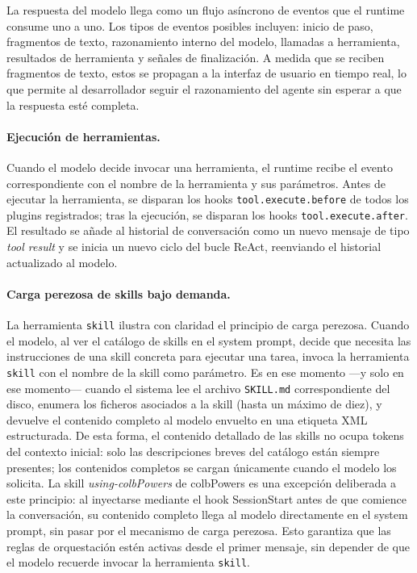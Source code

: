 \documentclass[11pt, letterpaper]{article}
\begin{document}
La respuesta del modelo llega como un flujo asíncrono de eventos que el runtime consume uno a uno. Los tipos de eventos posibles incluyen: inicio de paso, fragmentos de texto, razonamiento interno del modelo, llamadas a herramienta, resultados de herramienta y señales de finalización. A medida que se reciben fragmentos de texto, estos se propagan a la interfaz de usuario en tiempo real, lo que permite al desarrollador seguir el razonamiento del agente sin esperar a que la respuesta esté completa.

\paragraph{Ejecución de herramientas.}
Cuando el modelo decide invocar una herramienta, el runtime recibe el evento correspondiente con el nombre de la herramienta y sus parámetros. Antes de ejecutar la herramienta, se disparan los hooks \texttt{tool.execute.before} de todos los plugins registrados; tras la ejecución, se disparan los hooks \texttt{tool.execute.after}. El resultado se añade al historial de conversación como un nuevo mensaje de tipo \textit{tool result} y se inicia un nuevo ciclo del bucle ReAct, reenviando el historial actualizado al modelo.

\paragraph{Carga perezosa de skills bajo demanda.}
La herramienta \texttt{skill} ilustra con claridad el principio de carga perezosa. Cuando el modelo, al ver el catálogo de skills en el system prompt, decide que necesita las instrucciones de una skill concreta para ejecutar una tarea, invoca la herramienta \texttt{skill} con el nombre de la skill como parámetro. Es en ese momento ---y solo en ese momento--- cuando el sistema lee el archivo \texttt{SKILL.md} correspondiente del disco, enumera los ficheros asociados a la skill (hasta un máximo de diez), y devuelve el contenido completo al modelo envuelto en una etiqueta XML estructurada. De esta forma, el contenido detallado de las skills no ocupa tokens del contexto inicial: solo las descripciones breves del catálogo están siempre presentes; los contenidos completos se cargan únicamente cuando el modelo los solicita. La skill \textit{using-colbPowers} de colbPowers es una excepción deliberada a este principio: al inyectarse mediante el hook SessionStart antes de que comience la conversación, su contenido completo llega al modelo directamente en el system prompt, sin pasar por el mecanismo de carga perezosa. Esto garantiza que las reglas de orquestación estén activas desde el primer mensaje, sin depender de que el modelo recuerde invocar la herramienta \texttt{skill}.
\end{document}
